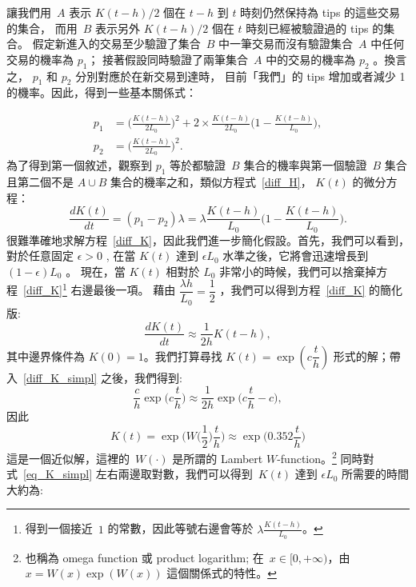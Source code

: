 \documentclass[12pt]{article}
\begin{document}
\begin{CJK}{UTF8}{bkai}
讓我們用~$A$ 表示 $K(t-h)/2$ 個在 $t-h$ 到 $t$ 時刻仍然保持為 tips 的這些交易的集合，
而用~$B$ 表示另外 $K(t-h)/2$ 個在 $t$ 時刻已經被驗證過的 tips 的集合。
假定新進入的交易至少驗證了集合~$B$ 中一筆交易而沒有驗證集合~$A$ 中任何交易的機率為 $p_1$；
接著假設同時驗證了兩筆集合~$A$ 中的交易的機率為 $p_2$ 。換言之， $p_1$ 和 $p_2$ 分別對應於在新交易到達時，
目前「我們」的 tips 增加或者減少 1 的機率。因此，得到一些基本關係式：

\begin{align*}
 p_1 &= \Big(\frac{K(t-h)}{2 L_0}\Big)^2 + 2\times
\frac{K(t-h)}{2 L_0}\Big(1-\frac{K(t-h)}{L_0}\Big),  \\
 p_2 &= \Big(\frac{K(t-h)}{2 L_0}\Big)^2.
\end{align*}
為了得到第一個敘述，觀察到 $p_1$ 等於都驗證~$B$ 集合的機率與第一個驗證~$B$ 集合且第二個不是 $A\cup B$ 集合的機率之和，類似方程式~\eqref{diff_H}，
$K(t)$ 的微分方程：
\begin{equation}
\label{diff_K}
 \frac{d K(t)}{dt} = (p_1-p_2)\lambda = \lambda
 \frac{K(t-h)}{ L_0}\Big(1-\frac{K(t-h)}{L_0}\Big).
\end{equation}
很難準確地求解方程~\eqref{diff_K}，因此我們進一步簡化假設。首先，我們可以看到，對於任意固定 $\epsilon >0$ ,
在當 $K(t)$ 達到 $\epsilon L_0$ 水準之後，它將會迅速增長到 $(1-\epsilon)L_0$ 。
現在，當 $K(t)$ 相對於 $L_0$ 非常小的時候，我們可以捨棄掉方程~\eqref{diff_K}\footnote{得到一個接近~$1$ 的常數，因此等號右邊會等於
$\lambda\frac{K(t-h)}{ L_0}$。} 右邊最後一項。
藉由 $\dfrac{\lambda h}{L_0}=\dfrac{1}{2}$ ，我們可以得到方程~\eqref{diff_K} 的簡化版:
\begin{equation}
\label{diff_K_simpl}
 \frac{d K(t)}{dt} \approx \frac{1}{2h}K(t-h),
\end{equation}
其中邊界條件為 $K(0)=1$。我們打算尋找 $K(t)=\exp(c\dfrac{t}{h})$ 形式的解；帶入~\eqref{diff_K_simpl} 之後，我們得到:
\[
 \frac{c}{h}\exp\Big(c\frac{t}{h}\Big) 
   \approx \frac{1}{2h}\exp\Big(c\frac{t}{h}-c\Big),
\]
因此 
\begin{equation}
\label{eq_K_simpl}
K(t)=\exp\Big(W\big({\textstyle\frac{1}{2}}\big)\frac{t}{h}\Big)
    \approx \exp\Big(0.352\frac{t}{h}\Big)
\end{equation}
這是一個近似解，這裡的~$W(\cdot)$ 是所謂的 Lambert $W$-function。\footnote{也稱為 omega function 或 product logarithm; 
在~$x\in [0,+\infty)$，由 $x=W(x)\exp(W(x))$ 這個關係式的特性。}
同時對式~\eqref{eq_K_simpl} 左右兩邊取對數，我們可以得到~$K(t)$ 達到 $\epsilon L_0$ 所需要的時間大約為:
\begin{equation}
 \label{eq_t0}

\end{equation}
\end{CJK}
\end{document}
